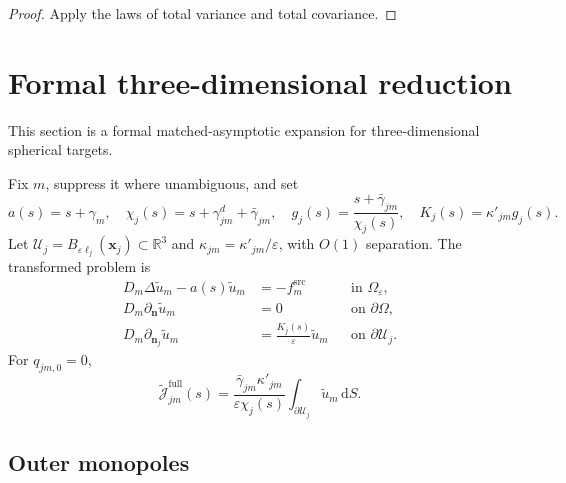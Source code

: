 \documentclass[pdflatex,sn-mathphys-num]{sn-jnl}
\numberwithin{equation}{section}
\theoremstyle{thmstyleone}%
\theoremstyle{definition}
\theoremstyle{remark}
\begin{document}
\begin{appendices}
\begin{proof}
Apply the laws of total variance and total covariance.
\end{proof}

\section{Formal three-dimensional reduction}
\label{app:formal_3d}

This section is a formal matched-asymptotic expansion for three-dimensional
spherical targets.

Fix $m$, suppress it where unambiguous, and set
\[
a(s)=s+\gamma_m,\quad
\chi_j(s)=s+\gamma^d_{jm}+\bar\gamma_{jm},\quad
g_j(s)=\frac{s+\bar\gamma_{jm}}{\chi_j(s)},\quad
K_j(s)=\kappa'_{jm}g_j(s).
\]
Let
$\mathcal U_j=B_{\varepsilon\ell_j}(\mathbf x_j)\subset\mathbb R^3$ and
$\kappa_{jm}=\kappa'_{jm}/\varepsilon$, with $O(1)$ separation. The transformed
problem is
\begin{subequations}
\label{eq:app_3d_problem}
\begin{align}
D_m\Delta\widetilde u_m-a(s)\widetilde u_m
&=-f_m^{\mathrm{src}}&&\text{in }\Omega_\varepsilon,\\
D_m\partial_{\mathbf n}\widetilde u_m&=0&&\text{on }\partial\Omega,\\
D_m\partial_{\mathbf n_j}\widetilde u_m
&=\frac{K_j(s)}{\varepsilon}\widetilde u_m
&&\text{on }\partial\mathcal U_j.
\end{align}
\end{subequations}
For $q_{jm,0}=0$,
\begin{equation}
\widetilde{\mathcal J}_{jm}^{\mathrm{full}}(s)
=\frac{\bar\gamma_{jm}\kappa'_{jm}}{\varepsilon\chi_j(s)}
\int_{\partial\mathcal U_j}\widetilde u_m\,\mathrm dS.
\label{eq:app_3d_exact_flux}
\end{equation}

\subsection{Outer monopoles}


\end{appendices}
\end{document}
